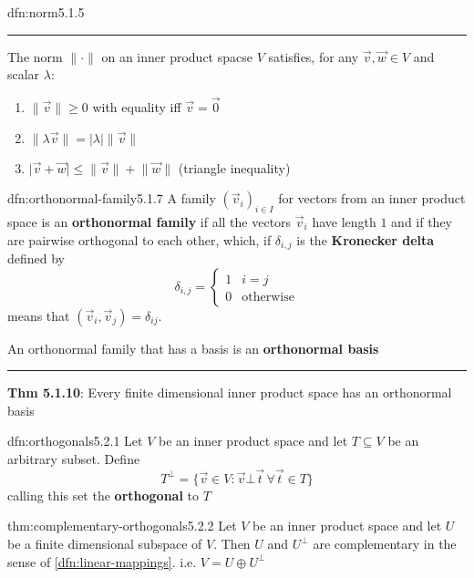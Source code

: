 \documentclass[landscape, 8pt]{extarticle}
\begin{document}
\begin{multicols}{3}
\begin{dfn}[Norm]{dfn:norm}{5.1.5}
    \noindent\rule{\textwidth}{0.2pt}
    The norm $\lVert \cdot \rVert$ on an inner product spacse $V$ satisfies, for any $\vec{v}, \vec{w}\in V$ and scalar $\lambda$:
    \begin{enumerate}
        \setlength\itemsep{0em}
        \item $\lVert \vec{v} \rVert \ge 0$ with equality iff $\vec{v} = \vec{0}$
        \item $\lVert \lambda \vec{v} \rVert = \lvert \lambda \rvert \lVert  \vec{v} \rVert$
        \item $\lvert \vec{v} + \vec{w} \rvert \le \lVert \vec{v} \rVert + \lVert \vec{w} \rVert$ (triangle inequality)
    \end{enumerate}
\end{dfn}

\newpage
\begin{dfn}{dfn:orthonormal-family}{5.1.7}
    A family $(\vec{v}_{i})_{i\in I}$ for vectors from an inner product space is an \textbf{orthonormal family} if all the vectors $\vec{v}_{i}$ have length $1$ and if they are pairwise orthogonal to each other, which, if $\delta_{i,j}$ is the \textbf{Kronecker delta} defined by
    \[\delta_{i, j} = \begin{cases}
        1 & i = j \\
        0 & \text{otherwise}
    \end{cases}\]
    means that $(\vec{v}_{i}, \vec{v}_{j}) = \delta_{ij}$.

    An orthonormal family that has a basis is an \textbf{orthonormal basis}
    
    \noindent\rule{\textwidth}{0.2pt}
    \textbf{Thm 5.1.10}: Every finite dimensional inner product space has an orthonormal basis
\end{dfn}

\begin{dfn}{dfn:orthogonals}{5.2.1}
    Let $V$ be an inner product space and let $T \subseteq V$ be an arbitrary subset. Define
    \[T^{\bot} = \{\vec{v} \in V : \vec{v} \bot \vec{t} \, \forall \vec{t}\in T\}\]
    calling this set the \textbf{orthogonal} to $T$
\end{dfn}

\begin{thm}{thm:complementary-orthogonals}{5.2.2}
    Let $V$ be an inner product space and let $U$ be a finite dimensional subspace of $V$. Then $U$ and $U^{\bot}$ are complementary in the sense of \ref{dfn:linear-mappings}. i.e. $V = U \oplus U^{\bot}$
\end{thm}


\end{multicols}
\end{document}
